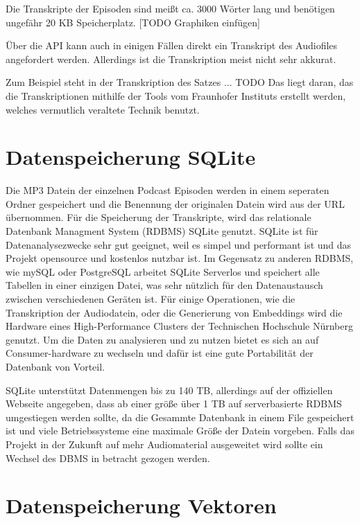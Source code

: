 Die Transkripte der Episoden sind meißt ca. 3000 Wörter lang und benötigen ungefähr 20 KB Speicherplatz. [TODO Graphiken einfügen]





Über die API kann auch in einigen Fällen direkt ein Transkript des Audiofiles angefordert werden. 
Allerdings ist die Transkription meist nicht sehr akkurat.


Zum Beispiel steht in der Transkription des Satzes ... TODO
Das liegt daran, das die Transkriptionen mithilfe der Tools vom Fraunhofer Instituts erstellt werden, welches vermutlich veraltete Technik benutzt.

\section{Datenspeicherung SQLite}

Die MP3 Datein der einzelnen Podcast Episoden werden in einem seperaten Ordner gespeichert und die Benennung der originalen Datein wird aus der URL übernommen.
Für die Speicherung der Transkripte, wird das relationale Datenbank Managment System (RDBMS) SQLite  genutzt.
SQLite ist für Datenanalysezwecke sehr gut geeignet, weil es simpel und performant ist und das Projekt opensource und kostenlos nutzbar ist.
Im Gegensatz zu anderen RDBMS, wie mySQL oder PostgreSQL arbeitet SQLite Serverlos und speichert alle Tabellen in einer einzigen Datei, was sehr nützlich für den Datenaustausch zwischen verschiedenen Geräten ist.
Für einige Operationen, wie die Transkription der Audiodatein, oder die Generierung von Embeddings wird die Hardware eines High-Performance Clusters der Technischen Hochschule Nürnberg genutzt. 
Um die Daten zu analysieren und zu nutzen bietet es sich an auf Consumer-hardware zu wechseln und dafür ist eine gute Portabilität der Datenbank von Vorteil.

SQLite unterstützt Datenmengen bis zu 140 TB, allerdings auf der offiziellen Webseite angegeben, dass ab einer größe über 1 TB auf serverbasierte RDBMS umgestiegen werden sollte, da die Gesammte Datenbank in einem File gespeichert ist und viele Betriebssysteme eine maximale Größe der Datein vorgeben.
Falls das Projekt in der Zukunft auf mehr Audiomaterial ausgeweitet wird sollte ein Wechsel des DBMS in betracht gezogen werden.

\section{Datenspeicherung Vektoren}

